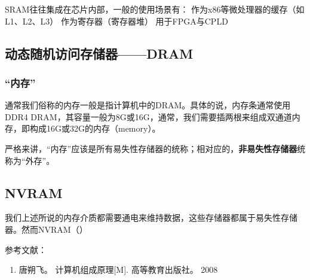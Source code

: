 SRAM往往集成在芯片内部，一般的使用场景有：
作为x86等微处理器的缓存（如L1、L2、L3）
作为寄存器（寄存器堆）
用于FPGA与CPLD

\subsection{动态随机访问存储器——DRAM}



\subsubsection{“内存”}

通常我们俗称的内存一般是指计算机中的DRAM。具体的说，内存条通常使用DDR4 DRAM，其容量一般为8G或16G，通常，我们需要插两根来组成双通道内存，即构成16G或32G的内存（memory）。

严格来讲，“内存”应该是所有易失性存储器的统称；相对应的，\textbf{非易失性存储器}统称为“外存”。





\subsection{NVRAM}

我们上述所说的内存介质都需要通电来维持数据，这些存储器都属于易失性存储器。然而NVRAM（）


参考文献：
\begin{enumerate}
\item 唐朔飞。 计算机组成原理[M]. 高等教育出版社。 2008
\end{enumerate}
